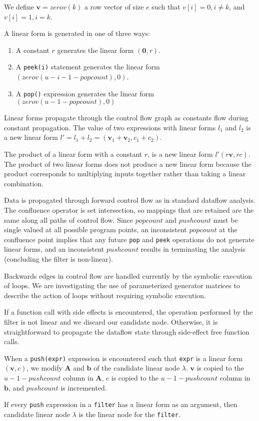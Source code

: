 We define ${\mathbf v} = zerov(k)$ a row vector of size $e$ such that
$v[i]=0, i \neq k$, and $v[i]=1,i=k$.

A linear form is generated in one of three ways:

\begin{enumerate}
\item A constant $r$ generates the linear form $({\mathbf 0},r)$. 
\vspace{-6pt}

\item A {\tt peek(i)} statement generates the linear form 
$(zerov(u-i-1-popcount), 0)$.
\vspace{-6pt}

\item A {\tt pop()} expression generates the linear form 
$(zerov(u-1-popcount),0)$

\end{enumerate}

Linear forms propagate through the control flow graph as constants
flow during constant propagation. The value of two expressions with
linear forms $l_1$ and $l_2$ is a new linear form
$l'=l_1+l_2=({\mathbf v}_1+{\mathbf v}_2, c_1+c_2)$.

The product of a linear form with a constant $r$, is a new linear form
$l' (r{\mathbf v},rc)$. The product of two linear forms does not
produce a new linear form because the product corresponds to
multiplying inputs together rather than taking a linear combination.

Data is propagated through forward control flow as in standard
dataflow analysis.  The confluence operator is set intersection, so
mappings that are retained are the same along all paths of control
flow. Since $popcount$ and $pushcount$ must be single valued at all
possible program points, an inconsistent $popcount$ at the confluence
point implies that any future {\tt pop} and {\tt peek} operations do
not generate linear forms, and an inconsistent $pushcount$ results in
terminating the analysis (concluding the filter is non-linear).

Backwards edges in control flow are handled currently by the symbolic
execution of loops. We are investigating the use of parameterized
generator matrices to describe the action of loops without requiring
symbolic execution.

If a function call with side effects is encountered, the operation
performed by the filter is not linear and we discard our candidate
node. Otherwise, it is straightforward to propagate the dataflow state
through side-effect free function calls.

When a {\tt push(expr)} expression is encountered such that {\tt expr}
is a linear form $({\mathbf v},c)$, we modify ${\mathbf A}$ and
${\mathbf b}$ of the candidate linear node $\lambda$.  ${\mathbf v}$
is copied to the $u-1-pushcount$ column in ${\mathbf A}$, $c$ is
copied to the $u-1-pushcount$ column in ${\mathbf b}$, and $pushcount$
is incremented.

If every {\tt push} expression in a {\tt filter} has a linear form as
an argument, then candidate linear node $\lambda$ is the linear node
for the {\tt filter}.
